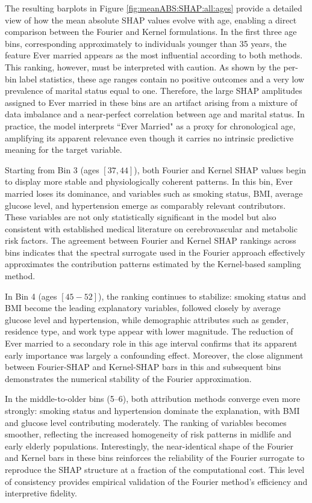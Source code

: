 \documentclass[letterpaper,11pt]{article}
\numberwithin{equation}{section}
\numberwithin{equation}{section}
\begin{document}
The resulting barplots in Figure \ref{fig:meanABS:SHAP:all:ages} provide a detailed view of how the mean absolute SHAP values evolve with age, enabling a direct comparison between the Fourier and Kernel formulations. In the first three age bins, corresponding approximately to individuals younger than 35 years, the feature Ever married appears as the most influential according to both methods. This ranking, however, must be interpreted with caution. As shown by the per-bin label statistics, these age ranges contain no positive outcomes and a very low prevalence of marital status equal to one. Therefore, the large SHAP amplitudes assigned to Ever married in these bins are an artifact arising from a mixture of data imbalance and a near-perfect correlation between age and marital status. In practice, the model interprets ``Ever Married" as a proxy for chronological age, amplifying its apparent relevance even though it carries no intrinsic predictive meaning for the target variable. 

Starting from Bin 3 (ages $[37,44]$), both Fourier and Kernel SHAP values begin to display more stable and physiologically coherent patterns. In this bin, Ever married loses its dominance, and variables such as smoking status, BMI, average glucose level, and hypertension emerge as comparably relevant contributors. These variables are not only statistically significant in the model but also consistent with established medical literature on cerebrovascular and metabolic risk factors. The agreement between Fourier and Kernel SHAP rankings across bins indicates that the spectral surrogate used in the Fourier approach effectively approximates the contribution patterns estimated by the Kernel-based sampling method.

In Bin 4 (ages $ [45-52]$), the ranking continues to stabilize: smoking status and BMI become the leading explanatory variables, followed closely by average glucose level and hypertension, while demographic attributes such as gender, residence type, and work type appear with lower magnitude. The reduction of Ever married to a secondary role in this age interval confirms that its apparent early importance was largely a confounding effect. Moreover, the close alignment between Fourier-SHAP and Kernel-SHAP bars in this and subsequent bins demonstrates the numerical stability of the Fourier approximation.

In the middle-to-older bins (5–6), both attribution methods converge even more strongly: smoking status and hypertension dominate the explanation, with BMI and glucose level contributing moderately. The ranking of variables becomes smoother, reflecting the increased homogeneity of risk patterns in midlife and early elderly populations. Interestingly, the near-identical shape of the Fourier and Kernel bars in these bins reinforces the reliability of the Fourier surrogate to reproduce the SHAP structure at a fraction of the computational cost. This level of consistency provides empirical validation of the Fourier method’s efficiency and interpretive fidelity.
\end{document}

